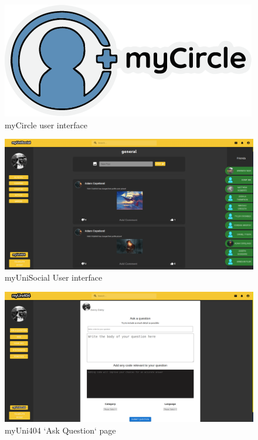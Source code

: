\documentclass[lettersize,journal]{IEEEtran}
\begin{document}
\begin{figure}[h!]
                \includegraphics[width=0.85\paperwidth]{images/myCircle.png}
                \caption{myCircle user interface}
                \label{figure 4}
\end{figure}
\begin{figure}[h!]
                \includegraphics[width=0.85\paperwidth]{images/myunisocial.png}
                \caption{myUniSocial User interface}
                \label{figure 4}
\end{figure}
\begin{figure}[h!]
                \includegraphics[width=0.85\paperwidth]{images/myUni4042.png}
                \caption{myUni404 `Ask Question` page}
                \label{figure 4}
\end{figure}
\end{document}
